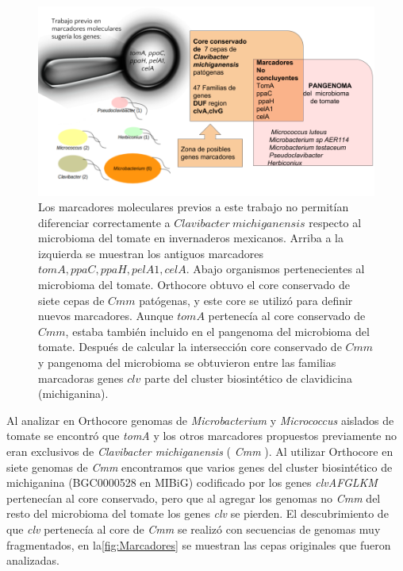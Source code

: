 \documentclass[12pt,twoside]{reedthesis}
\begin{document}
  \begin{figure}[h!tbp]
  \centering
  \includegraphics[angle = 0,scale = .5]{chapter1/Marcadores-Clavibacter.png}
  \caption[Los genes del cluster biosintético clv son marcadores de $Clavibacter$]{\footnotesize{Los marcadores moleculares previos a este trabajo no permitían diferenciar correctamente a $Clavibacter~michiganensis$ respecto al microbioma del tomate en invernaderos mexicanos. Arriba a la izquierda se muestran los antiguos marcadores $tomA, ppaC, ppaH, pelA1, celA$. Abajo organismos pertenecientes al microbioma del tomate. Orthocore obtuvo el core conservado de siete cepas de $Cmm$ patógenas, y este core se utilizó para definir nuevos marcadores. Aunque $tomA$ pertenecía al core conservado de $Cmm$, estaba también incluido en el pangenoma del microbioma del tomate. Después de calcular la intersección core conservado de $Cmm$ y pangenoma del microbioma se obtuvieron entre las familias marcadoras genes $clv$ parte del cluster biosintético de clavidicina (michiganina).}}
  \label{fig:Marcadores}
  \end{figure}
  
  Al analizar en Orthocore genomas de \emph{Microbacterium} y
  \emph{Micrococcus} aislados de tomate se encontró que \emph{tomA} y los
  otros marcadores propuestos previamente no eran exclusivos de
  \emph{Clavibacter michiganensis} ( \emph{Cmm} ). Al utilizar Orthocore
  en siete genomas de \emph{Cmm} encontramos que varios genes del cluster
  biosintético de michiganina (BGC0000528 en MIBiG) codificado por los
  genes \emph{clvAFGLKM} pertenecían al core conservado, pero que al
  agregar los genomas no \emph{Cmm} del resto del microbioma del tomate
  los genes \emph{clv} se pierden. El descubrimiento de que \emph{clv}
  pertenecía al core de \emph{Cmm} se realizó con secuencias de genomas
  muy fragmentados, en la\autoref{fig:Marcadores} se muestran las cepas
  originales que fueron analizadas.
  
\end{document}
